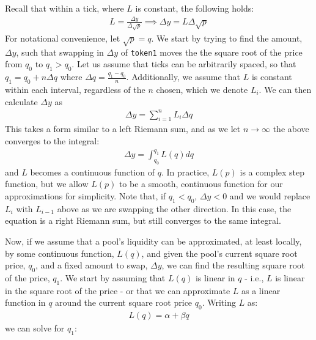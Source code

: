 \documentclass[11pt]{article}
\begin{document}
Recall that within a tick, where $L$ is constant, the following holds:
\begin{gather*}
    L = \frac{\Delta y}{\Delta \sqrt{p}} \implies \Delta y = L \Delta \sqrt{p}
\end{gather*}
For notational convenience, let $\sqrt{p} = q$. We start by trying to find the amount, $\Delta y$, such that swapping in $\Delta y$ of \texttt{token1} moves the the square root of the price from $q_0$ to $q_1 > q_0$. Let us assume that ticks can be arbitrarily spaced, so that $q_1 = q_0 + n \Delta q$ where $\Delta q = \frac{q_1 - q_0}{n}$. Additionally, we assume that $L$ is constant within each interval, regardless of the $n$ chosen, which we denote $L_i$. We can then calculate $\Delta y$ as
\begin{gather*}
    \Delta y = \sum_{i=1}^{n} L_i \Delta q
\end{gather*}
This takes a form similar to a left Riemann sum, and as we let $n \rightarrow \infty$ the above converges to the integral:
\begin{gather}
    \Delta y = \int_{q_0}^{q_1} L(q) dq
\end{gather}
and $L$ becomes a continuous function of $q$. In practice, $L(p)$ is a complex step function, but we allow $L(p)$ to be a smooth, continuous function for our approximations for simplicity. Note that, if $q_1 < q_0$, $\Delta y < 0$ and we would replace $L_i$ with $L_{i-1}$ above as we are swapping the other direction. In this case, the equation is a right Riemann sum, but still converges to the same integral.

Now, if we assume that a pool's liquidity can be approximated, at least locally, by some continuous function, $L(q)$, and given the pool's current square root price, $q_0$, and a fixed amount to swap, $\Delta y$, we can find the resulting square root of the price, $q_1$. We start by assuming that $L(q)$ is linear in $q$ - i.e., $L$ is linear in the square root of the price - or that we can approximate $L$ as a linear function in $q$ around the current square root price $q_0$. Writing $L$ as:
\begin{gather*}
    L(q) = \alpha + \beta q
\end{gather*}
we can solve for $q_1$:
\end{document}
